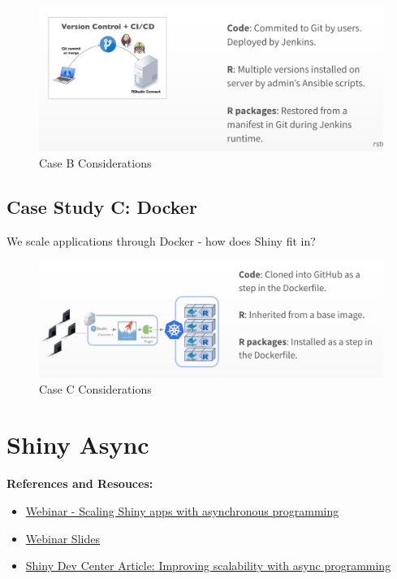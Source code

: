 \documentclass[]{book}
\providecommand{\tightlist}{%
  \setlength{\itemsep}{0pt}\setlength{\parskip}{0pt}}
\theoremstyle{definition}
\theoremstyle{definition}
\theoremstyle{definition}
\theoremstyle{remark}
\begin{document}
\begin{figure}
\centering
\includegraphics{imgs/case-studies/case-b.png}
\caption{Case B Considerations}
\end{figure}

\hypertarget{case-study-c-docker}{%
\section{Case Study C: Docker}\label{case-study-c-docker}}

We scale applications through Docker - how does Shiny fit in?

\begin{figure}
\centering
\includegraphics{imgs/case-studies/case-c.png}
\caption{Case C Considerations}
\end{figure}

\hypertarget{shiny-async}{%
\chapter{Shiny Async}\label{shiny-async}}

\textbf{References and Resouces:}

\begin{itemize}
\tightlist
\item
  \href{https://resources.rstudio.com/webinars/scaling-shiny-apps-with-async-programming-june-2018}{Webinar
  - Scaling Shiny apps with asynchronous programming}
\item
  \href{https://github.com/rstudio/webinars/blob/master/56-scaling-shiny-apps/Scaling\%20Shiny\%20apps\%20with\%20async\%20programming.pdf}{Webinar
  Slides}
\item
  \href{http://shiny.rstudio.com/articles/async.html}{Shiny Dev Center
  Article: Improving scalability with async programming}
\end{itemize}
\end{document}

